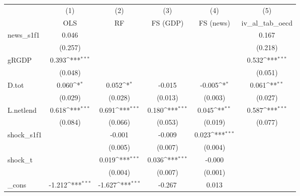 {
\def\sym#1{\ifmmode^{#1}\else\(^{#1}\)\fi}
\begin{tabular}{l*{5}{c}}
\toprule
            &\multicolumn{1}{c}{(1)}&\multicolumn{1}{c}{(2)}&\multicolumn{1}{c}{(3)}&\multicolumn{1}{c}{(4)}&\multicolumn{1}{c}{(5)}\\
            &\multicolumn{1}{c}{OLS}&\multicolumn{1}{c}{RF}&\multicolumn{1}{c}{FS (GDP)}&\multicolumn{1}{c}{FS (news)}&\multicolumn{1}{c}{iv\_al\_tab\_oecd}\\
\midrule
news\_s1f1   &       0.046         &                     &                     &                     &       0.167         \\
            &     (0.257)         &                     &                     &                     &     (0.218)         \\
\addlinespace
gRGDP       &       0.393\sym{***}&                     &                     &                     &       0.532\sym{***}\\
            &     (0.048)         &                     &                     &                     &     (0.051)         \\
\addlinespace
D.tot       &       0.060\sym{*}  &       0.052\sym{*}  &      -0.015         &      -0.005\sym{*}  &       0.061\sym{**} \\
            &     (0.029)         &     (0.028)         &     (0.013)         &     (0.003)         &     (0.027)         \\
\addlinespace
L.netlend   &       0.618\sym{***}&       0.691\sym{***}&       0.180\sym{***}&       0.045\sym{**} &       0.587\sym{***}\\
            &     (0.084)         &     (0.066)         &     (0.053)         &     (0.019)         &     (0.077)         \\
\addlinespace
shock\_s1f1  &                     &      -0.001         &      -0.009         &       0.023\sym{***}&                     \\
            &                     &     (0.005)         &     (0.007)         &     (0.004)         &                     \\
\addlinespace
shock\_t     &                     &       0.019\sym{***}&       0.036\sym{***}&      -0.000         &                     \\
            &                     &     (0.004)         &     (0.007)         &     (0.001)         &                     \\
\addlinespace
\_cons      &      -1.212\sym{***}&      -1.627\sym{***}&      -0.267         &       0.013         &                     \\

\end{tabular}}
